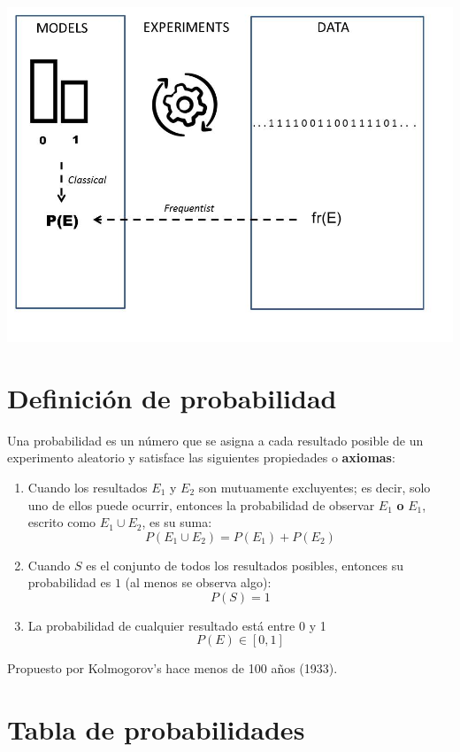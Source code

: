 \documentclass[
]{book}
\providecommand{\tightlist}{%
  \setlength{\itemsep}{0pt}\setlength{\parskip}{0pt}}
\begin{document}
\includegraphics{./figures/prob.JPG}

\hypertarget{definiciuxf3n-de-probabilidad}{%
\section{Definición de probabilidad}\label{definiciuxf3n-de-probabilidad}}

Una probabilidad es un número que se asigna a cada resultado posible de un experimento aleatorio y satisface las siguientes propiedades o \textbf{axiomas}:

\begin{enumerate}
\def\labelenumi{\arabic{enumi})}
\tightlist
\item
  Cuando los resultados \(E_1\) y \(E_2\) son mutuamente excluyentes; es decir, solo uno de ellos puede ocurrir, entonces la probabilidad de observar \(E_1\) \textbf{o} \(E_1\), escrito como \(E_1\cup E_2\), es su suma:
  \[P(E_1\cup E_2) = P(E_1) + P(E_2)\]
\item
  Cuando \(S\) es el conjunto de todos los resultados posibles, entonces su probabilidad es \(1\) (al menos se observa algo): \[P(S)=1\]
\item
  La probabilidad de cualquier resultado está entre 0 y 1 \[P(E) \in [0,1]\]
\end{enumerate}

Propuesto por Kolmogorov's hace menos de 100 años (1933).

\hypertarget{tabla-de-probabilidades}{%
\section{Tabla de probabilidades}\label{tabla-de-probabilidades}}
\end{document}
